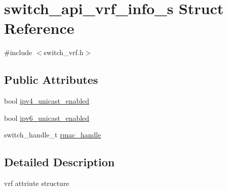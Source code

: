 \hypertarget{structswitch__api__vrf__info__s}{\section{switch\+\_\+api\+\_\+vrf\+\_\+info\+\_\+s Struct Reference}
\label{structswitch__api__vrf__info__s}
}


{\ttfamily \#include $<$switch\+\_\+vrf.\+h$>$}

\subsection*{Public Attributes}
\begin{DoxyCompactItemize}
\item 
bool \hyperlink{structswitch__api__vrf__info__s_a28d658f137adc54c3d41cc093912bcc4}{ipv4\+\_\+unicast\+\_\+enabled}
\item 
bool \hyperlink{structswitch__api__vrf__info__s_a7e2a8628f52442986e7d476442bd0809}{ipv6\+\_\+unicast\+\_\+enabled}
\item 
switch\+\_\+handle\+\_\+t \hyperlink{structswitch__api__vrf__info__s_aba545a6b833435ce0b569b449fd575c5}{rmac\+\_\+handle}
\end{DoxyCompactItemize}


\subsection{Detailed Description}
vrf attriute structure 


